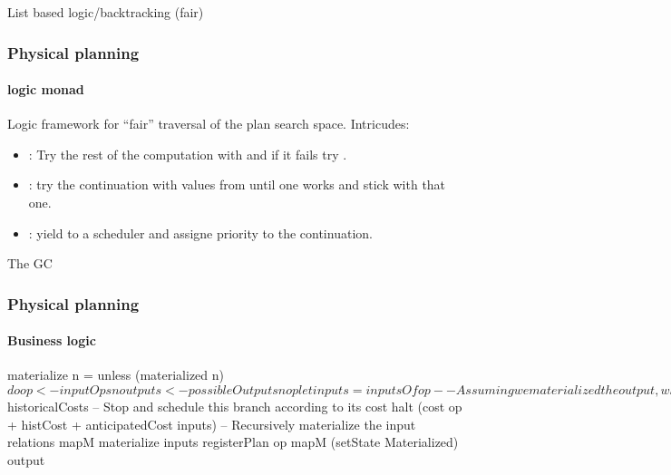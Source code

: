 \begin{frame}{List based logic/backtracking (fair)}
\fairexample
{}
\end{frame}

\begin{frame}
  \frametitle{Physical planning}
  \framesubtitle{ logic monad}

  Logic framework for ``fair'' traversal of the plan search space. Intricudes:

  \begin{itemize}
  \item {}: Try the rest of the computation with 
    and if it fails try .
  \item {}: try the continuation with values from 
    until one works and stick with that one.
  \item {}: yield to a scheduler and assigne priority
     to the continuation.
  \end{itemize}
\end{frame}


\begin{frame}{The GC}
  \gcexample
\end{frame}

\begin{frame}[fragile]
  \frametitle{Physical planning}
  \framesubtitle{Business logic}
  \begin{code}
    \begin{haskellcode}
    materialize n = unless (materialized n) $ do
      op <- inputOps n
      outputs <- possibleOutputs n op
      let inputs = inputsOf op
      -- Assuming we materialized the output, what is the cost of the
      -- outputs
      once (gc outputs)
      histCost <- withMaterialized outputs $ historicalCosts
      -- Stop and schedule this branch according to its cost
      halt (cost op + histCost + anticipatedCost inputs)
      -- Recursively materialize the input relations
      mapM materialize inputs
      registerPlan op
      mapM (setState Materialized) output
    \end{haskellcode}
  \end{code}
\end{frame}

